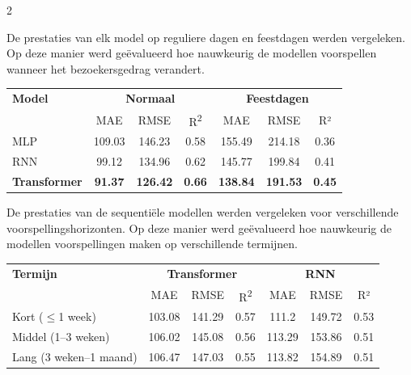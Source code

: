 \documentclass[a0,portrait]{hogent-poster}
\begin{document}
\begin{multicols}{2}
\vspace{10mm}

De prestaties van elk model op reguliere dagen en feestdagen werden vergeleken. Op deze manier werd geëvalueerd hoe nauwkeurig de modellen voorspellen wanneer het bezoekersgedrag verandert.

\begin{center}
\begin{tabular}{|l|ccc|ccc|}
            \toprule
            \textbf{Model} & \multicolumn{3}{c}{\textbf{Normaal}} &
            \multicolumn{3}{c}{\textbf{Feestdagen}} \\
            & MAE & RMSE & R\textsuperscript{2} & MAE & RMSE & R² \\
            \midrule
            MLP         & 109.03 & 146.23 & 0.58 & 155.49 & 214.18 & 0.36 \\
            RNN         & 99.12 & 134.96 & 0.62 & 145.77 & 199.84 & 0.41 \\
            \textbf{Transformer} & \textbf{91.37} & \textbf{126.42} & \textbf{0.66} & \textbf{138.84} & \textbf{191.53} & \textbf{0.45} \\
            \bottomrule
        \end{tabular}
\end{center}

\vspace{10mm}

De prestaties van de sequentiële modellen werden vergeleken voor verschillende voorspellingshorizonten. Op deze manier werd geëvalueerd hoe nauwkeurig de modellen voorspellingen maken op verschillende termijnen.

\begin{center}
        \begin{tabular}{|l|ccc|ccc|}
            \toprule
            \textbf{Termijn} & \multicolumn{3}{c}{\textbf{Transformer}} &
            \multicolumn{3}{c}{\textbf{RNN}} \\
            & MAE & RMSE & R\textsuperscript{2} & MAE & RMSE & R² \\
            \midrule
            Kort ($\leq$1 week)   & 103.08 & 141.29 & 0.57 & 111.2 & 149.72 & 0.53 \\
            Middel (1--3 weken)   & 106.02 & 145.08 & 0.56 & 113.29 & 153.86 & 0.51 \\
            Lang (3 weken--1 maand) & 106.47 & 147.03 & 0.55 & 113.82 & 154.89 & 0.51 \\
            \bottomrule
        \end{tabular}
\end{center}


\end{multicols}
\end{document}
